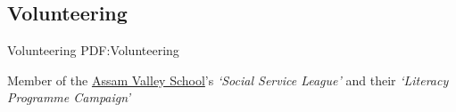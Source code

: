 \documentclass[a4paper,10pt,oneside]{article}
\begin{document}
\begin{body}
%
%
%

\section
{Volunteering}
{Volunteering}
{PDF:Volunteering}

Member of the \href{http://www.assamvalleyschool.com}{Assam Valley School}'s \textit{`Social Service League'} and their \textit{`Literacy Programme Campaign'}



%


\end{body}
\end{document}
